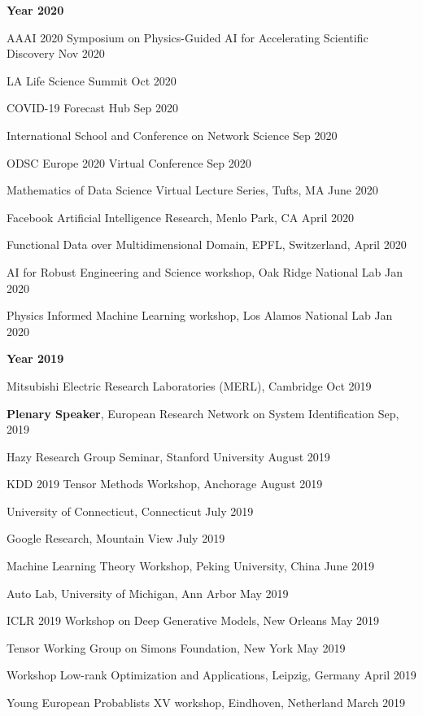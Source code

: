 \documentclass[margin,line]{res}
\begin{document}
\begin{resume}
 {\bf Year  2020}


AAAI 2020 Symposium on Physics-Guided AI for Accelerating Scientific Discovery \hfill{Nov 2020}

LA Life Science Summit \hfill{Oct 2020}

COVID-19 Forecast Hub  \hfill{Sep 2020}
 
International School and Conference on Network Science  \hfill{Sep 2020}
 
 
 ODSC Europe 2020 Virtual Conference \hfill{Sep 2020}

 
 Mathematics of Data Science Virtual Lecture Series, Tufts, MA \hfill{June 2020}
 
 
Facebook Artificial Intelligence Research,  Menlo Park, CA \hfill{April 2020}


 Functional Data over Multidimensional Domain, EPFL, Switzerland,   \hfill{April 2020}
 
 
AI for Robust Engineering and Science workshop,  Oak Ridge National Lab \hfill{Jan 2020}
 
 
Physics Informed Machine Learning workshop,  Los Alamos National Lab \hfill {Jan 2020}


 {\bf Year  2019}
 

Mitsubishi Electric Research Laboratories (MERL), Cambridge  \hfill {Oct  2019}


\textbf{Plenary Speaker},  European Research Network on System Identification   \hfill {Sep, 2019}


Hazy Research Group Seminar,  Stanford University  \hfill {August 2019}

KDD 2019 Tensor Methods Workshop, Anchorage \hfill{August 2019}

University  of Connecticut,   Connecticut \hfill{July 2019}

Google  Research, Mountain View \hfill{July 2019}

Machine Learning Theory Workshop,  Peking University, China  \hfill{June 2019}

Auto Lab, University of Michigan, Ann Arbor  \hfill{May 2019}

ICLR 2019 Workshop on Deep Generative Models, New Orleans  \hfill{May 2019}

Tensor Working Group  on Simons Foundation, New York  \hfill{May  2019}

Workshop Low-rank Optimization and Applications,  Leipzig, Germany \hfill{April 2019}

 Young European Probablists XV workshop, Eindhoven, Netherland  \hfill{March 2019}
 

\end{resume}
\end{document}
